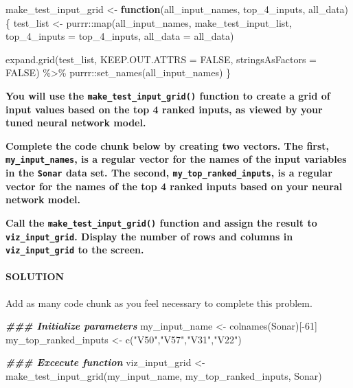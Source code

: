 \documentclass[
]{article}
\newenvironment{Shaded}{\begin{snugshade}}{\end{snugshade}}
\newcommand{\AttributeTok}[1]{\textcolor[rgb]{0.77,0.63,0.00}{#1}}
\newcommand{\ConstantTok}[1]{\textcolor[rgb]{0.00,0.00,0.00}{#1}}
\newcommand{\ControlFlowTok}[1]{\textcolor[rgb]{0.13,0.29,0.53}{\textbf{#1}}}
\newcommand{\DecValTok}[1]{\textcolor[rgb]{0.00,0.00,0.81}{#1}}
\newcommand{\DocumentationTok}[1]{\textcolor[rgb]{0.56,0.35,0.01}{\textbf{\textit{#1}}}}
\newcommand{\FunctionTok}[1]{\textcolor[rgb]{0.00,0.00,0.00}{#1}}
\newcommand{\NormalTok}[1]{#1}
\newcommand{\OtherTok}[1]{\textcolor[rgb]{0.56,0.35,0.01}{#1}}
\newcommand{\SpecialCharTok}[1]{\textcolor[rgb]{0.00,0.00,0.00}{#1}}
\newcommand{\StringTok}[1]{\textcolor[rgb]{0.31,0.60,0.02}{#1}}
\begin{document}
\begin{Shaded}
\begin{Highlighting}[]
\NormalTok{make\_test\_input\_grid }\OtherTok{\textless{}{-}} \ControlFlowTok{function}\NormalTok{(all\_input\_names, top\_4\_inputs, all\_data)}
\NormalTok{\{}
\NormalTok{  test\_list }\OtherTok{\textless{}{-}}\NormalTok{ purrr}\SpecialCharTok{::}\FunctionTok{map}\NormalTok{(all\_input\_names, }
\NormalTok{                          make\_test\_input\_list,}
                          \AttributeTok{top\_4\_inputs =}\NormalTok{ top\_4\_inputs,}
                          \AttributeTok{all\_data =}\NormalTok{ all\_data)}
  
  \FunctionTok{expand.grid}\NormalTok{(test\_list, }
              \AttributeTok{KEEP.OUT.ATTRS =} \ConstantTok{FALSE}\NormalTok{,}
              \AttributeTok{stringsAsFactors =} \ConstantTok{FALSE}\NormalTok{) }\SpecialCharTok{\%\textgreater{}\%} 
\NormalTok{    purrr}\SpecialCharTok{::}\FunctionTok{set\_names}\NormalTok{(all\_input\_names)}
\NormalTok{\}}
\end{Highlighting}
\end{Shaded}

\textbf{You will use the \texttt{make\_test\_input\_grid()} function to
create a grid of input values based on the top 4 ranked inputs, as
viewed by your tuned neural network model.}

\textbf{Complete the code chunk below by creating two vectors. The
first, \texttt{my\_input\_names}, is a regular vector for the names of
the input variables in the \texttt{Sonar} data set. The second,
\texttt{my\_top\_ranked\_inputs}, is a regular vector for the names of
the top 4 ranked inputs based on your neural network model.}

\textbf{Call the \texttt{make\_test\_input\_grid()} function and assign
the result to \texttt{viz\_input\_grid}. Display the number of rows and
columns in \texttt{viz\_input\_grid} to the screen.}

\hypertarget{solution-10}{%
\paragraph{SOLUTION}\label{solution-10}}

Add as many code chunk as you feel necessary to complete this problem.

\begin{Shaded}
\begin{Highlighting}[]
\DocumentationTok{\#\#\# Initialize parameters}
\NormalTok{my\_input\_name }\OtherTok{\textless{}{-}} \FunctionTok{colnames}\NormalTok{(Sonar)[}\SpecialCharTok{{-}}\DecValTok{61}\NormalTok{]}
\NormalTok{my\_top\_ranked\_inputs }\OtherTok{\textless{}{-}} \FunctionTok{c}\NormalTok{(}\StringTok{"V50"}\NormalTok{,}\StringTok{"V57"}\NormalTok{,}\StringTok{"V31"}\NormalTok{,}\StringTok{"V22"}\NormalTok{)}

\DocumentationTok{\#\#\# Excecute function}
\NormalTok{viz\_input\_grid }\OtherTok{\textless{}{-}} \FunctionTok{make\_test\_input\_grid}\NormalTok{(my\_input\_name, my\_top\_ranked\_inputs, Sonar)}
\end{Highlighting}
\end{Shaded}
\end{document}
